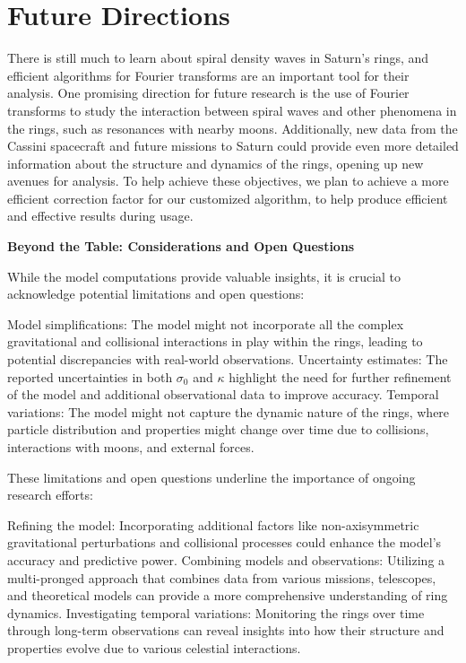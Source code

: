 \documentclass{article}
\begin{document}
\section{Future Directions}
There is still much to learn about spiral density waves in Saturn's rings, and efficient algorithms for Fourier transforms are an important tool for their analysis. One promising direction for future research is the use of Fourier transforms to study the interaction between spiral waves and other phenomena in the rings, such as resonances with nearby moons. Additionally, new data from the Cassini spacecraft and future missions to Saturn could provide even more detailed information about the structure and dynamics of the rings, opening up new avenues for analysis. To help achieve these objectives, we plan to achieve a more efficient correction factor for our customized algorithm, to help produce efficient and effective results during usage. 




\textbf{Beyond the Table: Considerations and Open Questions}

While the model computations provide valuable insights, it is crucial to acknowledge potential limitations and open questions:

Model simplifications: The model might not incorporate all the complex gravitational and collisional interactions in play within the rings, leading to potential discrepancies with real-world observations.
Uncertainty estimates: The reported uncertainties in both $\sigma_{0}$ and $\kappa$ highlight the need for further refinement of the model and additional observational data to improve accuracy.
Temporal variations: The model might not capture the dynamic nature of the rings, where particle distribution and properties might change over time due to collisions, interactions with moons, and external forces.

These limitations and open questions underline the importance of ongoing research efforts:

Refining the model: Incorporating additional factors like non-axisymmetric gravitational perturbations and collisional processes could enhance the model's accuracy and predictive power.
Combining models and observations: Utilizing a multi-pronged approach that combines data from various missions, telescopes, and theoretical models can provide a more comprehensive understanding of ring dynamics.
Investigating temporal variations: Monitoring the rings over time through long-term observations can reveal insights into how their structure and properties evolve due to various celestial interactions.
\end{document}
